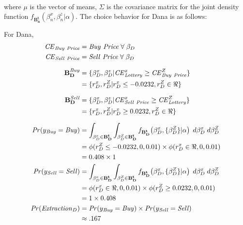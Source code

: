 \documentclass[../main.tex]{subfiles}
\begin{document}
\addtocounter{footnote}{-1}

\noindent where $\mu$ is the vector of means, $\Sigma$ is the covariance matrix for the joint density function $f_{\mathbf{B_n^t}}(\beta_n^x,\beta_n^z|\alpha)$.
The choice behavior for Dana is as follows:

\noindent For Dana,
\begin{align}
	\begin{split}
		{\ensuremath{\mathit{CE}}}_{\mathit{Buy\ Price}} &= \mathit{Buy\ Price} \;\forall\; \beta_D\\
		{\mathit{CE}}_{\mathit{Sell\ Price}} &= \mathit{Sell\ Price} \;\forall\; \beta_D\\[1.5ex]
		\mathbf{B_D^{\mathit{Buy}}} &= \{ \beta_D^x,\beta_D^z | {\mathit{CE}}_{\mathit{Lottery}}^x \geq {\ensuremath{\mathit{CE}}}_{\mathit{Buy\ Price}}^Z \}\\
		&= \{ r_D^x,r_D^Z | r_D^x \leq -0.0232, r_D^Z \in \Re\}\\[1.5ex]
		\mathbf{B_D^{\mathit{Sell}}} &= \{ \beta_D^x,\beta_D^z | {\mathit{CE}}_{\mathit{Sell\ Price}}^x \geq {\ensuremath{\mathit{CE}}}_{\mathit{Lottery}}^Z \}\\
		&= \{ r_D^x,r_D^Z | r_D^x \geq 0.0232, r_D^Z \in \Re\}\\[1.5ex]
		{\ensuremath{\mathit{Pr}}}(y_{\mathit{Buy}} = \mathit{Buy}) &= \int_{\beta_D^x \in \mathbf{B^t_D}}\int_{\beta_D^Z \in \mathbf{B^t_D}} f_{\mathbf{B^t_D}}\!\left(\beta_D^x,\{\beta_D^Z\}|\alpha\right) \;d\beta_D^x \; d\beta_D^Z\\
		&= \phi(r_D^Z \leq -0.0232,0,0.01) \times \phi(r_D^x \in \Re,0,0.01)\\
		&= 0.408 \times 1\\
		{\mathit{Pr}}(y_{\mathit{Sell}} = \mathit{Sell}) &= \int_{\beta_D^x \in \mathbf{B^t_D}}\int_{\beta_D^Z \in \mathbf{B^t_D}} f_{\mathbf{B^t_D}}\!\left(\beta_D^x,\{\beta_D^Z\}|\alpha\right) \;d\beta_D^x \; d\beta_D^Z\\
		&= \phi(r_D^x \in \Re,0,0.01) \times \phi(r_D^Z \geq 0.0232,0,0.01)\\
		&= 1 \times 0.408\\
	{\mathit{Pr}}(\mathit{Extraction}_D) &= {\mathit{Pr}}(y_{\mathit{Buy}} = \mathit{Buy}) \times {\ensuremath{\mathit{Pr}}}(y_{\mathit{Sell}} = \mathit{Sell})\\
	&\approx .167
	\end{split}
\end{align}
\end{document}
